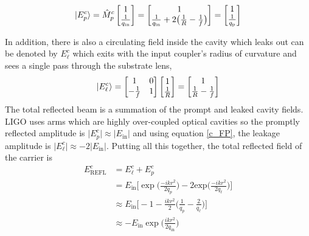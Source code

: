		\begin{equation}\label{eq:promptE}
		 \ket{E^{c}_{p}}=
		 \hat{M}^{c}_{p}
		 \begin{bmatrix}
		 					1  
		 \\ 	\frac{1}{q_{\text{in}}}
		 \end{bmatrix}
		 =
		 \begin{bmatrix}
		 1  
		 \\ 	\frac{1}{q_{\text{in}}} + 2 \big(\frac{1}{R} - \frac{1}{f}\big)
		 \end{bmatrix}
		 =
		 \begin{bmatrix}
		 1  
		 \\ 	\frac{1}{q_{\text{p}}}
		 \end{bmatrix}
		\end{equation}
		
		In addition, there is also a circulating field inside the cavity which leaks out can be denoted by $E^c_{\ell}$ which exits with the input coupler's radius of curvature and sees a single pass through the substrate lens,
		\begin{equation}\label{eq:leakE}
		\ket{E^c_{\ell}} = 		 
		\begin{bmatrix}
		1 	&	0 
		\\ 	-\frac{1}{f} 	&	1
		\end{bmatrix}
		\begin{bmatrix}
		1  
		\\ 	\frac{1}{R}
		\end{bmatrix}
		=
		\begin{bmatrix}
		1  
		\\ 	\frac{1}{R} - \frac{1}{f}
		\end{bmatrix}
		\end{equation}
		The total reflected beam is a summation of the prompt and leaked cavity fields.  LIGO uses arms which are highly over-coupled optical cavities so the promptly reflected amplitude is $\vert E^c_p \vert \approx \vert E_{\text{in}} \vert$ and using equation \ref{c_FP}, the leakage amplitude is $\vert E^c_\ell \vert \approx -2\vert E_{\text{in}} \vert$.  Putting all this together, the total reflected field of the carrier is
		\begin{equation}
		\begin{aligned}
		E^c_{\text{REFL}} 	&= E^c_{\ell} + E^c_p \\
							&= E_{\text{in}} \bigg[ \exp \bigg(\frac{-ik r^2}{2q_p}\bigg) - 2  \text{exp} \bigg(\frac{-ik r^2}{2q_{\ell}}\bigg) \bigg]\\
							&\approx E_{\text{in}} \bigg[ -1 - \frac{ikr^2}{2} \bigg( \frac{1}{q_p} - \frac{2}{q_\ell} \bigg) \bigg]\\
							&\approx -E_{\text{in}} \exp\bigg(\frac{ikr^2}{2q_{\text{in}}}\bigg) 
		\end{aligned} 
		\end{equation}
